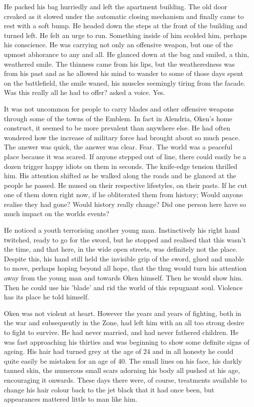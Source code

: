 He packed his bag hurriedly and left the apartment building. The old door creaked as it slowed under the automatic closing mechanism and finally came to rest with a soft bump. He headed down the steps at the front of the building and turned left. He felt an urge to run. Something inside of him scolded him, perhaps his conscience. He was carrying not only an offensive weapon, but one of the upmost abhorance to any and all. He glanced down at the bag and smiled, a thin, weathered smile. The thinness came from his lips, but the weatheredness was from his past and as he allowed his mind to wander to some of those days spent on the battlefield, the smile waned, his muscles seemingly tiring from the facade. Was this really all he had to offer? asked a voice. Yes.

It was not uncommon for people to carry blades and other offensive weapons through some of the towns of the Emblem. In fact in Alendria, Oken's home construct, it seemed to be more prevalent than anywhere else. He had often wondered how the increase of military force had brought about so much peace. The answer was quick, the answer was clear. Fear. The world was a peaceful place because it was scared. If anyone stepped out of line, there could easily be a dozen trigger happy idiots on them in seconds. The knife-edge tension thrilled him. His attention shifted as he walked along the roads and he glanced at the people he passed. He mused on their respective lifestyles, on their pasts. If he cut one of them down right now, if he obliterated them from history; Would anyone realise they had gone? Would history really change? Did one person here have so much impact on the worlds events?

He noticed a youth terrorising another young man. Instinctively his right hand twitched, ready to go for the sword, but he stopped and realised that this wasn't the time, and that here, in the wide open streets, was definitely not the place. Despite this, his hand still held the invisible grip of the sword, glued and unable to move, perhaps hoping beyond all hope, that the thug would turn his attention away from the young man and towards Oken himself. Then he would show him. Then he could use his 'blade' and rid the world of this repugnant soul. Violence has its place he told himself.

Oken was not violent at heart. However the years and years of fighting, both in the war and subsequently in the Zone, had left him with an all too strong desire to fight to survive. He had never married, and had never fathered children. He was fast approaching his thirties and was beginning to show some definite signs of ageing. His hair had turned grey at the age of 24 and in all honesty he could quite easily be mistaken for an age of 40. The small lines on his face, his darkly tanned skin, the numerous small scars adorning his body all pushed at his age, encouraging it onwards. These days there were, of course, treatments available to change his hair colour back to the jet black that it had once been, but appearances mattered little to man like him.

